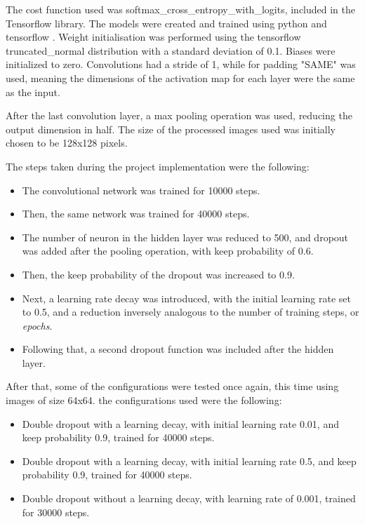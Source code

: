 \documentclass[final,12p,times]{elsarticle}
\begin{document}
\begin{Itemize}
The cost function used was softmax\_cross\_entropy\_with\_logits, included in the Tensorflow library.
The models were created and trained using python \cite{python} and tensorflow \cite{45166}.
Weight initialisation was performed using the tensorflow truncated\_normal distribution with a standard deviation of 0.1.
Biases were initialized to zero.
Convolutions had a stride of 1, while for padding "SAME" was used, meaning the dimensions of the activation map for each layer were the same as the input.

After the last convolution layer, a max pooling operation was used, reducing the output dimension in half.
The size of the processed images used was initially chosen to be 128x128 pixels.

The steps taken during the project implementation were the following:

\begin{itemize}
\item The convolutional network was trained for 10000 steps.
\item Then, the same network was trained for 40000 steps.
\item The number of neuron in the hidden layer was reduced to 500, and dropout was added after the pooling operation, with keep probability of 0.6.
\item Then, the keep probability of the dropout was increased to 0.9.
\item Next, a learning rate decay was introduced, with the initial learning rate set to 0.5, and a reduction inversely analogous to the number of training steps, or \emph{epochs}.
\item Following that, a second dropout function was included after the hidden layer.
\end {itemize}


After that, some of the configurations were tested once again, this time using images of size 64x64.
the configurations used were the following:

\begin{itemize}
\item Double dropout with a learning decay, with initial learning rate 0.01, and keep probability 0.9, trained for 40000 steps.
\item Double dropout with a learning decay, with initial learning rate 0.5, and keep probability 0.9, trained for 40000 steps.
\item Double dropout without a learning decay, with learning rate  of 0.001, trained for 30000 steps.
\end {itemize}


\end{Itemize}
\end{document}
